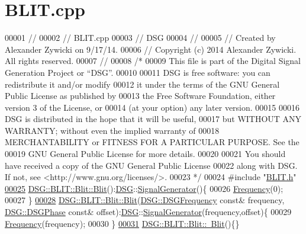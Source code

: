 \hypertarget{_b_l_i_t_8cpp_source}{\section{B\+L\+I\+T.\+cpp}
\label{_b_l_i_t_8cpp_source}
}

\begin{DoxyCode}
00001 \textcolor{comment}{//}
00002 \textcolor{comment}{//  BLIT.cpp}
00003 \textcolor{comment}{//  DSG}
00004 \textcolor{comment}{//}
00005 \textcolor{comment}{//  Created by Alexander Zywicki on 9/17/14.}
00006 \textcolor{comment}{//  Copyright (c) 2014 Alexander Zywicki. All rights reserved.}
00007 \textcolor{comment}{//}
00008 \textcolor{comment}{/*}
00009 \textcolor{comment}{ This file is part of the Digital Signal Generation Project or “DSG”.}
00010 \textcolor{comment}{}
00011 \textcolor{comment}{ DSG is free software: you can redistribute it and/or modify}
00012 \textcolor{comment}{ it under the terms of the GNU General Public License as published by}
00013 \textcolor{comment}{ the Free Software Foundation, either version 3 of the License, or}
00014 \textcolor{comment}{ (at your option) any later version.}
00015 \textcolor{comment}{}
00016 \textcolor{comment}{ DSG is distributed in the hope that it will be useful,}
00017 \textcolor{comment}{ but WITHOUT ANY WARRANTY; without even the implied warranty of}
00018 \textcolor{comment}{ MERCHANTABILITY or FITNESS FOR A PARTICULAR PURPOSE.  See the}
00019 \textcolor{comment}{ GNU General Public License for more details.}
00020 \textcolor{comment}{}
00021 \textcolor{comment}{ You should have received a copy of the GNU General Public License}
00022 \textcolor{comment}{ along with DSG.  If not, see <http://www.gnu.org/licenses/>.}
00023 \textcolor{comment}{ */}
00024 \textcolor{preprocessor}{#include "\hyperlink{_b_l_i_t_8h}{BLIT.h}"}
\hypertarget{_b_l_i_t_8cpp_source_l00025}{}\hyperlink{class_d_s_g_1_1_b_l_i_t_1_1_blit_a1d9bed6285a8b3c0e073f3e3662716af}{00025} \hyperlink{class_d_s_g_1_1_b_l_i_t_1_1_blit_a1d9bed6285a8b3c0e073f3e3662716af}{DSG::BLIT::Blit::Blit}():\hyperlink{namespace_d_s_g}{DSG}::\hyperlink{class_d_s_g_1_1_signal_generator}{SignalGenerator}()\{
00026     \hyperlink{class_d_s_g_1_1_signal_generator_a4e6b3c43e76e53f8cd337ad699c464cb}{Frequency}(0);
00027 \}
\hypertarget{_b_l_i_t_8cpp_source_l00028}{}\hyperlink{class_d_s_g_1_1_b_l_i_t_1_1_blit_a8ab0fb1b908d641527bb86a81d1722ba}{00028} \hyperlink{class_d_s_g_1_1_b_l_i_t_1_1_blit_a1d9bed6285a8b3c0e073f3e3662716af}{DSG::BLIT::Blit::Blit}(\hyperlink{namespace_d_s_g_a4315a061386fa1014fda09b15d3a6973}{DSG::DSGFrequency} \textcolor{keyword}{const}& frequency,
      \hyperlink{namespace_d_s_g_a44431ce1eb0a7300efdd207bc879e52c}{DSG::DSGPhase} \textcolor{keyword}{const}& offset):\hyperlink{namespace_d_s_g}{DSG}::\hyperlink{class_d_s_g_1_1_signal_generator}{SignalGenerator}(frequency,offset)\{
00029     \hyperlink{class_d_s_g_1_1_signal_generator_a4e6b3c43e76e53f8cd337ad699c464cb}{Frequency}(frequency);
00030 \}
\hypertarget{_b_l_i_t_8cpp_source_l00031}{}\hyperlink{class_d_s_g_1_1_b_l_i_t_1_1_blit_a92da2e1763735b3e17f7b9a24377f988}{00031} \hyperlink{class_d_s_g_1_1_b_l_i_t_1_1_blit_a92da2e1763735b3e17f7b9a24377f988}{DSG::BLIT::Blit::~Blit}()\{\}
\end{DoxyCode}
